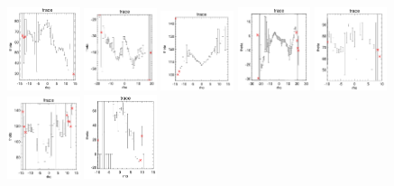 \documentclass[fleqn,usenatbib]{mnras}
\begin{document}
\begin{figure}
    \includegraphics[width=0.19\textwidth]{Images/trace-plots/trace-plots-cpsbs/8315-3703.png}
    \includegraphics[width=0.19\textwidth]{Images/trace-plots/trace-plots-cpsbs/8331-6104.png}
     \includegraphics[width=0.19\textwidth]{Images/trace-plots/trace-plots-cpsbs/8555-3701.png}
    \includegraphics[width=0.19\textwidth]{Images/trace-plots/trace-plots-cpsbs/8623-9102.png}
    \includegraphics[width=0.19\textwidth]{Images/trace-plots/trace-plots-cpsbs/8655-1902.png}
    \includegraphics[width=0.19\textwidth]{Images/trace-plots/trace-plots-cpsbs/8713-3701.png}
    \includegraphics[width=0.19\textwidth]{Images/trace-plots/trace-plots-cpsbs/8725-1902.png}

\end{figure}
\end{document}
